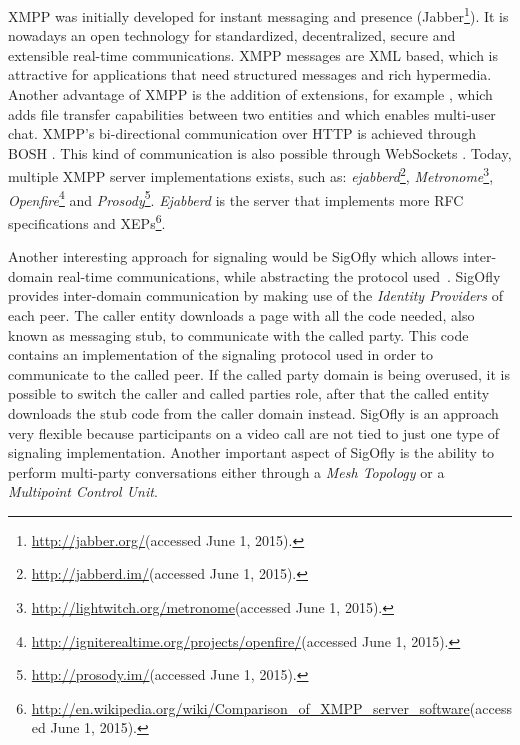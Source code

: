   \ac{XMPP} was initially developed for instant messaging and presence (Jabber\footnote{\url{http://jabber.org/}(accessed June 1, 2015).}). It is nowadays an open technology for standardized, decentralized, secure and extensible real-time communications. 
  \ac{XMPP} messages are \ac{XML} based, which is attractive for applications that need structured messages and rich hypermedia. Another advantage of \ac{XMPP} is the addition of extensions, for example \cite{xep0096}, which adds file transfer capabilities between two entities and \cite{xep0045} which enables multi-user chat.
  \ac{XMPP}'s bi-directional communication over \ac{HTTP} is achieved through \ac{BOSH} \cite{xep0206}.
  This kind of communication is also possible through WebSockets \cite{rfc7395}.
  Today, multiple XMPP server implementations exists, such as: \emph{ejabberd}\footnote{\url{http://jabberd.im/}(accessed June 1, 2015).}, \emph{Metronome}\footnote{\url{http://lightwitch.org/metronome}(accessed June 1, 2015).}, \emph{Openfire}\footnote{\url{http://igniterealtime.org/projects/openfire/}(accessed June 1, 2015).} and \emph{Prosody}\footnote{\url{http://prosody.im/}(accessed June 1, 2015).}. \emph{Ejabberd} is the server that implements more \ac{RFC} specifications and \ac{XEP}s\footnote{\url{http://en.wikipedia.org/wiki/Comparison_of_XMPP_server_software}(accessed June 1, 2015).}.
  
  Another interesting approach for signaling would be \ac{SigOfly} which allows inter-domain real-time communications, while abstracting the protocol used~\cite{sigofly}.
  \ac{SigOfly} provides inter-domain communication by making use of the \emph{Identity Providers} of each peer. 
  The caller entity downloads a page with all the code needed, also known as messaging stub, to communicate with the called party.
  This code contains an implementation of the signaling protocol used in order to communicate to the called peer. If the called party domain is being overused, it is possible to switch the caller and called parties role, after that the called entity downloads the stub code from the caller domain instead.
  \ac{SigOfly} is an approach very flexible because participants on a video call are not tied to just one type of signaling implementation. Another important aspect of \ac{SigOfly} is the ability to perform multi-party conversations either through a \emph{Mesh Topology} or a \emph{Multipoint Control Unit}.
